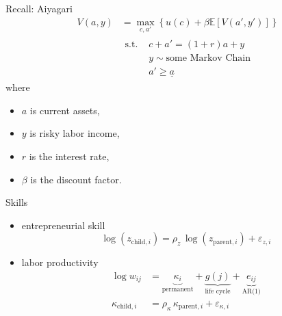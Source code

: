 \documentclass[aspectratio=169,mathserif]{beamer}
\begin{document}
\begin{frame}{Recall: Aiyagari}
    \begin{align*}
    V(a, y) &= \max_{c, a'} \left\{ u(c) + \beta \mathbb{E}[V(a', y')] \right\} \\
    &\begin{aligned} \text{s.t. } & c + a' = (1 + r) a + y
        \\
        &y \sim \text{some Markov Chain} \\
        &a' \geq \underline{a}
    \end{aligned}
    \end{align*}
    where
    \begin{itemize}
        \item $a$ is current assets,
        \item $y$ is risky labor income,
        \item $r$ is the interest rate,
        \item $\beta$ is the discount factor.
    \end{itemize}
\end{frame}

\begin{frame}{Skills}
    \begin{itemize}
        \item entrepreneurial skill
        \begin{equation*}
            \log(z_{\text{child},i})
            = \rho_z\,\log(z_{\text{parent},i}) 
               + \varepsilon_{z,i}
        \end{equation*}
        \item labor productivity
        \begin{align*}        
            \log w_{i j}
                &= \underbrace{\kappa_i}_{\text{permanent}}
                   + \underbrace{g(j)}_{\text{life cycle}}
                   + \underbrace{e_{i j}}_{\text{AR(1)}}                \\
            \kappa_{\text{child},i}
                &= \rho_{\kappa}\,\kappa_{\text{parent},i} 
                   + \varepsilon_{\kappa,i}                                
        \end{align*}    
    \end{itemize}
\end{frame}
\end{document}
